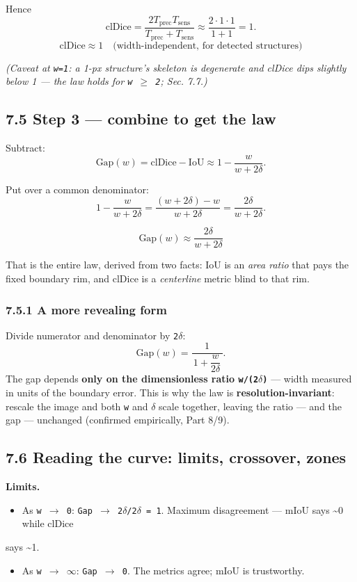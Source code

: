 \documentclass[11pt]{article}
\begin{document}
Hence \[\text{clDice} = \frac{2T_\text{prec}T_\text{sens}}{T_\text{prec}+T_\text{sens}} \approx \frac{2\cdot1\cdot1}{1+1} = 1.\] \[\boxed{\;\text{clDice} \approx 1\quad\text{(width-independent, for detected structures)}\;}\]

\textit{(Caveat at \texttt{w=1}: a 1-px structure's skeleton is degenerate and clDice dips slightly below 1 --- the law holds for \texttt{w $\geq$ 2}; Sec. 7.7.)}

\subsection*{7.5 Step 3 --- combine to get the law}

Subtract: \[\text{Gap}(w) = \text{clDice} - \text{IoU} \approx 1 - \frac{w}{w+2\delta}.\]

Put over a common denominator: \[1 - \frac{w}{w+2\delta} = \frac{(w+2\delta) - w}{w+2\delta} = \frac{2\delta}{w+2\delta}.\]

\[\boxed{\;\text{Gap}(w) \approx \dfrac{2\delta}{w+2\delta}\;}\]

That is the entire law, derived from two facts: IoU is an \textit{area ratio} that pays the fixed boundary rim, and clDice is a \textit{centerline} metric blind to that rim.

\subsubsection*{7.5.1 A more revealing form}
Divide numerator and denominator by \texttt{2$\delta$}: \[\text{Gap}(w) = \frac{1}{\,1 + \dfrac{w}{2\delta}\,}.\] The gap depends \textbf{only on the dimensionless ratio \texttt{w/(2$\delta$)}} --- width measured in units of the boundary error. This is why the law is \textbf{resolution-invariant}: rescale the image and both \texttt{w} and \texttt{$\delta$} scale together, leaving the ratio --- and the gap --- unchanged (confirmed empirically, Part 8/9).

\subsection*{7.6 Reading the curve: limits, crossover, zones}

\textbf{Limits.}
\begin{itemize}\setlength{\itemsep}{1pt}
\item As \texttt{w $\rightarrow$ 0}: \texttt{Gap $\rightarrow$ 2$\delta$/2$\delta$ = 1}. Maximum disagreement --- mIoU says \textasciitilde{}0 while clDice
\end{itemize}
  says \textasciitilde{}1.
\begin{itemize}\setlength{\itemsep}{1pt}
\item As \texttt{w $\rightarrow$ $\infty$}: \texttt{Gap $\rightarrow$ 0}. The metrics agree; mIoU is trustworthy.
\end{itemize}
\end{document}

